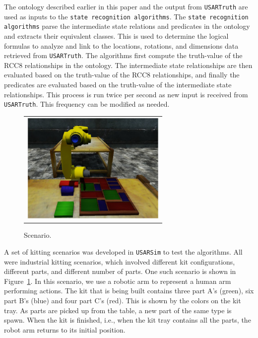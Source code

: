 \documentclass[preprint,12pt]{elsarticle}
\begin{document}
The ontology described earlier in this paper and the output from \texttt{USARTruth} are used as inputs to the \texttt{state recognition algorithms}. The \texttt{state recognition algorithms} parse the intermediate state relations and predicates in the ontology and extracts their equivalent classes. This is used to determine the logical formulas to analyze and link to the locations, rotations, and dimensions data retrieved from \texttt{USARTruth}. The algorithms first compute the truth-value of the RCC8 relationships in the ontology. The intermediate state relationships are then evaluated based on the truth-value of the RCC8 relationships, and finally the predicates are evaluated based on the truth-value of the intermediate state relationships. This process is run twice per second as new input is received from \texttt{USARTruth}. This frequency can be modified as needed.

\begin{figure}[t!h!]
\begin{center}
\begin{tabular}{c}
\includegraphics[width=7cm]{simulation.pdf}
\end{tabular}
\end{center}
\caption{Scenario.}
\label{fig:scenario}
\end{figure}

A set of kitting scenarios was developed in \texttt{USARSim} to test the algorithms. All were industrial kitting scenarios, which involved different kit configurations, different parts, and different number of parts. One such scenario is shown in Figure~\ref{fig:scenario}. In this scenario, we use a robotic arm to represent a human arm performing actions. The kit that is being built contains three part A's (green), six part B's (blue) and four part C's (red). This is shown by the colors on the kit tray. As parts are picked up from the table, a new part of the same type is spawn. When the kit is finished, i.e., when the kit tray contains all the parts, the robot arm returns to its initial position.
\end{document}
